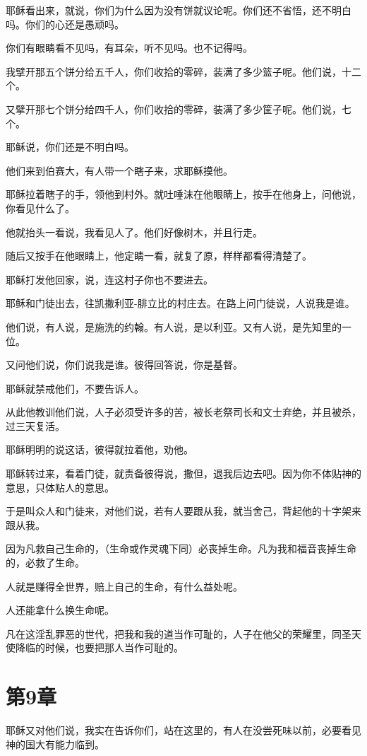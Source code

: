 \documentclass[12pt,oneside]{book}
\begin{document}
耶稣看出来，就说，你们为什么因为没有饼就议论呢。你们还不省悟，还不明白吗。你们的心还是愚顽吗。

你们有眼睛看不见吗，有耳朵，听不见吗。也不记得吗。

我擘开那五个饼分给五千人，你们收拾的零碎，装满了多少篮子呢。他们说，十二个。

又擘开那七个饼分给四千人，你们收拾的零碎，装满了多少筐子呢。他们说，七个。

耶稣说，你们还是不明白吗。

他们来到伯赛大，有人带一个瞎子来，求耶稣摸他。

耶稣拉着瞎子的手，领他到村外。就吐唾沫在他眼睛上，按手在他身上，问他说，你看见什么了。

他就抬头一看说，我看见人了。他们好像树木，并且行走。

随后又按手在他眼睛上，他定睛一看，就复了原，样样都看得清楚了。

耶稣打发他回家，说，连这村子你也不要进去。

耶稣和门徒出去，往凯撒利亚-腓立比的村庄去。在路上问门徒说，人说我是谁。

他们说，有人说，是施洗的约翰。有人说，是以利亚。又有人说，是先知里的一位。

又问他们说，你们说我是谁。彼得回答说，你是基督。

耶稣就禁戒他们，不要告诉人。

从此他教训他们说，人子必须受许多的苦，被长老祭司长和文士弃绝，并且被杀，过三天复活。

耶稣明明的说这话，彼得就拉着他，劝他。

耶稣转过来，看着门徒，就责备彼得说，撒但，退我后边去吧。因为你不体贴神的意思，只体贴人的意思。

于是叫众人和门徒来，对他们说，若有人要跟从我，就当舍己，背起他的十字架来跟从我。

因为凡救自己生命的，（生命或作灵魂下同）必丧掉生命。凡为我和福音丧掉生命的，必救了生命。

人就是赚得全世界，赔上自己的生命，有什么益处呢。

人还能拿什么换生命呢。

凡在这淫乱罪恶的世代，把我和我的道当作可耻的，人子在他父的荣耀里，同圣天使降临的时候，也要把那人当作可耻的。

\chapter{第9章}
耶稣又对他们说，我实在告诉你们，站在这里的，有人在没尝死味以前，必要看见神的国大有能力临到。
\end{document}
